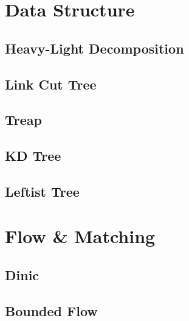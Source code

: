 \documentclass{article}
\begin{document}
\section{Data Structure}

\subsection{Heavy-Light Decomposition}


%

\subsection{Link Cut Tree}


\subsection{Treap}


\subsection{KD Tree}


\subsection{Leftist Tree}


\section{Flow \& Matching}

\subsection{Dinic}


\subsection{Bounded Flow}

\end{document}
